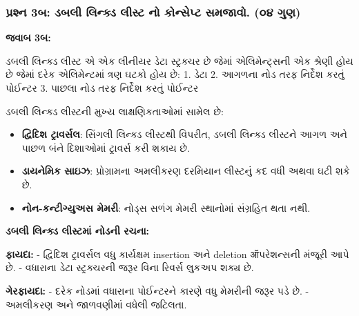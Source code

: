 \hypertarget{uxaaauxab0uxab6uxaa8-3uxaac-uxaa1uxaacuxab2-uxab2uxaa8uxa95uxaa1-uxab2uxab8uxa9f-uxaa8-uxa95uxaa8uxab8uxaaauxa9f-uxab8uxaaeuxa9cuxab5.-uxae6uxaea-uxa97uxaa3}{%
\subsubsection{પ્રશ્ન 3બ: ડબલી લિન્ક્ડ લીસ્ટ નો કોન્સેપ્ટ સમજાવો. (૦૪
ગુણ)}\label{uxaaauxab0uxab6uxaa8-3uxaac-uxaa1uxaacuxab2-uxab2uxaa8uxa95uxaa1-uxab2uxab8uxa9f-uxaa8-uxa95uxaa8uxab8uxaaauxa9f-uxab8uxaaeuxa9cuxab5.-uxae6uxaea-uxa97uxaa3}}

\textbf{જવાબ 3બ:}

ડબલી લિન્ક્ડ લીસ્ટ એ એક લીનીયર ડેટા સ્ટ્રક્ચર છે જેમાં એલિમેન્ટ્સની એક શ્રેણી હોય છે જેમાં
દરેક એલિમેન્ટમાં ત્રણ ઘટકો હોય છે: 1. ડેટા 2. આગળના નોડ તરફ નિર્દેશ કરતું પોઈન્ટર 3.
પાછલા નોડ તરફ નિર્દેશ કરતું પોઈન્ટર

ડબલી લિન્ક્ડ લીસ્ટની મુખ્ય લાક્ષણિકતાઓમાં સામેલ છે:

\begin{itemize}
\tightlist
\item
  \textbf{દ્વિદિશ ટ્રાવર્સલ}: સિંગલી લિન્ક્ડ લીસ્ટથી વિપરીત, ડબલી લિન્ક્ડ લીસ્ટને
  આગળ અને પાછળ બંને દિશાઓમાં ટ્રાવર્સ કરી શકાય છે.
\item
  \textbf{ડાયનેમિક સાઇઝ}: પ્રોગ્રામના અમલીકરણ દરમિયાન લીસ્ટનું કદ વધી અથવા ઘટી
  શકે છે.
\item
  \textbf{નોન-કન્ટીગ્યુઅસ મેમરી}: નોડ્સ સળંગ મેમરી સ્થાનોમાં સંગ્રહિત થતા નથી.
\end{itemize}

\textbf{ડબલી લિન્ક્ડ લીસ્ટમાં નોડની રચના:}

\begin{Shaded}
\begin{Highlighting}[]
     \NormalTok{(}
        \OperatorTok{=}
         \OperatorTok{=} 
        \OperatorTok{=} 
\end{Highlighting}
\end{Shaded}

\textbf{ફાયદા:} - દ્વિદિશ ટ્રાવર્સલ વધુ કાર્યક્ષમ insertion અને deletion
ऑપરેશન્સની મંજૂરી આપે છે. - વધારાના ડેટા સ્ટ્રક્ચરની જરૂર વિના રિવર્સ લુકઅપ શક્ય છે.

\textbf{ગેરફાયદા:} - દરેક નોડમાં વધારાના પોઈન્ટરને કારણે વધુ મેમરીની જરૂર પડે છે. -
અમલીકરણ અને જાળવણીમાં વધેલી જટિલતા.

